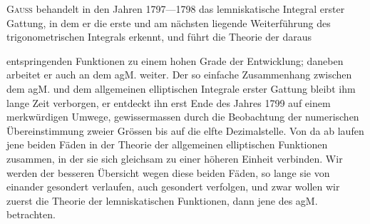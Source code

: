 \textsc{Gauss} behandelt in den Jahren 1797—1798 das lemniskatische Integral
erster Gattung, in dem er die erste und am nächsten liegende Weiterführung
des trigonometrischen Integrals erkennt, und führt die Theorie der daraus\par
\clearpage{}
\noindent entspringenden Funktionen zu einem hohen Grade der Entwicklung; daneben
arbeitet er auch an dem agM. weiter. Der so einfache Zusammenhang zwischen
dem agM. und dem allgemeinen elliptischen Integrale erster Gattung
bleibt ihm lange Zeit verborgen, er entdeckt ihn erst Ende des Jahres 1799
auf einem merkwürdigen Umwege, gewissermassen durch die Beobachtung der
numerischen Übereinstimmung zweier Grössen bis auf die elfte Dezimalstelle.
Von da ab laufen jene beiden Fäden in der Theorie der allgemeinen elliptischen
Funktionen zusammen, in der sie sich gleichsam zu einer höheren Einheit
verbinden. Wir werden der besseren Übersicht wegen diese beiden Fäden,
so lange sie von einander gesondert verlaufen, auch gesondert verfolgen, und
zwar wollen wir zuerst die Theorie der lemniskatischen Funktionen, dann jene
des agM. betrachten.
